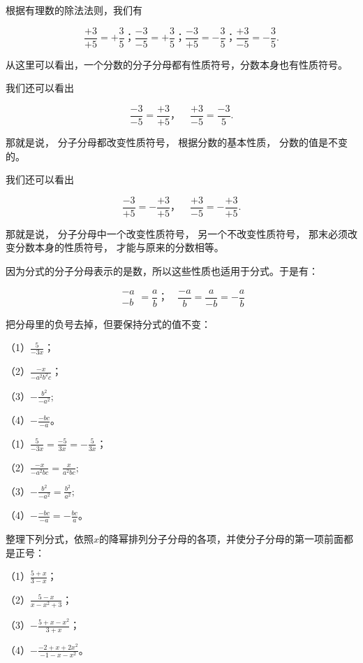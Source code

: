 根据有理数的除法法则，我们有

\[
\frac{+ 3}{+ 5} = + \frac{3}{5}\text{；} \frac{- 3}{- 5} = + \frac{3}{5}\text{；} \frac{- 3}{+ 5} = - \frac{3}{5}\text{；} \frac{+ 3}{- 5} = - \frac{3}{5}.
\]

从这里可以看出，一个分数的分子分母都有性质符号，分数本身也有性质符号。

我们还可以看出

\[
\frac{- 3}{- 5} = \frac{+ 3}{+ 5}\text{，} \quad \frac{+ 3}{- 5} = \frac{- 3}{5}.
\]

那就是说， 分子分母都改变性质符号， 根据分数的基本性质，
分数的值是不变的。

我们还可以看出

\[
\frac{- 3}{+ 5} = - \frac{+ 3}{+ 5}\text{，} \quad \frac{+ 3}{- 5} = - \frac{+ 3}{+ 5}.
\]

那就是说， 分子分母中一个改变性质符号， 另一个不改变性质符号，
那末必须改变分数本身的性质符号， 才能与原来的分数相等。

因为分式的分子分母表示的是数，所以这些性质也适用于分式。于是有：

\[
\boxed { \begin{array}{c} - a \\ - b \end{array} } = \frac{a}{b}\text{；} \quad \frac{- a}{b} = \frac{a}{- b} = - \frac{a}{b}
\]

 把分母里的负号去掉，但要保持分式的值不变：

（1）\(\frac{5}{-3x}\)；

（2）\(\frac{-x}{-a^2b^2c}\)；

（3）\(-\frac{b^{2}}{-a^{2}};\)

（4）\(-\frac{-bc}{-a}\)。

 （1）\(\frac{5}{-3x} = \frac{-5}{3x} = -\frac{5}{3x}\)；

（2）\(\frac{-x}{-a^2bc} = \frac{x}{a^2bc};\)

（3）\(-\frac{b^2}{-a^2} = \frac{b^2}{a^2};\)

（4）\(-\frac{-bc}{-a} = -\frac{bc}{a}\)。

整理下列分式，依照\(x\)的降幂排列分子分母的各项，并使分子分母的第一项前面都是正号：

（1）\(\frac{5 + x}{3 - x}\)；

（2）\(\frac{5 - x}{x - x^2 + 3}\)；

（3）\(-\frac{5 + x - x^2}{3 + x}\)；

（4）\(-\frac{-2 + x + 2x^2}{-1 - x - x^2}\)。

